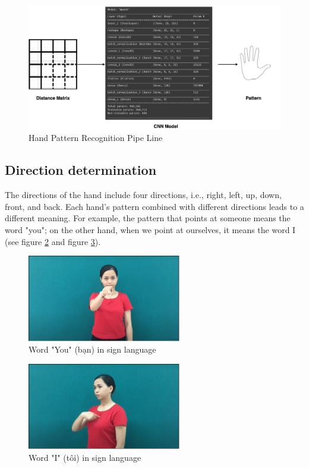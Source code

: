 \begin{figure}[H]
	\centering
	\includegraphics[width=\textwidth]{img/Chap4/Hand-Pattern-Reg-Model.png}
	\caption{Hand Pattern Recognition Pipe Line}
	\label{fig:Chap4-StructureOfConvolutionalNeuralNetwork}
\end{figure}

\subsection{Direction determination}

The directions of the hand include four directions, i.e., right, left, up, down, front, and back. Each hand's pattern combined with different directions leads to a different meaning. For example, the pattern that points at someone means the word "you"; on the other hand, when we point at ourselves, it means the word I (see figure \ref{fig:Chap4-WordYouInSignLanguage} and figure \ref{fig:Chap4-WordIInSignLanguage}).

\begin{figure}[H]
	\centering
	\includegraphics[width=0.6\textwidth]{img/Chap4/WordYouInSignLanguage.png}
	\caption{Word "You" (bạn) in sign language}
	\label{fig:Chap4-WordYouInSignLanguage}
\end{figure}

\begin{figure}[H]
	\centering
	\includegraphics[width=0.6\textwidth]{img/Chap4/WordIInSignLanguage.png}
	\caption{Word "I" (tôi) in sign language}
	\label{fig:Chap4-WordIInSignLanguage}
\end{figure}

